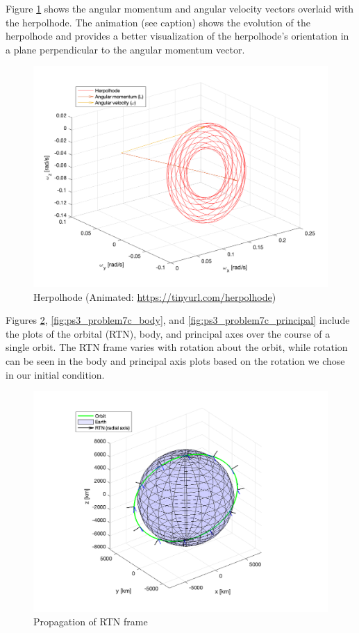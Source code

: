 Figure \ref{fig:ps3_problem7b} shows the angular momentum and angular velocity vectors overlaid with the herpolhode. The animation (see caption) shows the evolution of the herpolhode and provides a better visualization of the herpolhode's orientation in a plane perpendicular to the angular momentum vector. 

\begin{figure}[H]
\centering
\includegraphics[scale=0.7]{Images/ps3_problem7b.png}
\caption{Herpolhode (Animated: \protect\url{https://tinyurl.com/herpolhode})}
\label{fig:ps3_problem7b}
\end{figure}

Figures \ref{fig:ps3_problem7c_rtn}, \ref{fig:ps3_problem7c_body}, and \ref{fig:ps3_problem7c_principal} include the plots of the orbital (RTN), body, and principal axes over the course of a single orbit. The RTN frame varies with rotation about the orbit, while rotation can be seen in the body and principal axis plots based on the rotation we chose in our initial condition.

\begin{figure}[H]
\centering
\includegraphics[scale=0.7]{Images/ps3_problem7c_rtn.png}
\caption{Propagation of RTN frame}
\label{fig:ps3_problem7c_rtn}
\end{figure}


